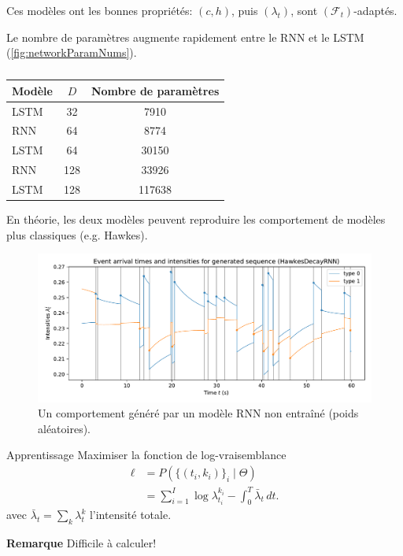 \documentclass{beamer}
\begin{document}
\begin{frame}
Ces modèles ont les bonnes propriétés: $(c,h)$, puis $(\lambda_t)$, sont $(\mathcal{F}_t)$-adaptés.

Le nombre de paramètres augmente rapidement entre le RNN et le LSTM (\autoref{fig:networkParamNums}).

\begin{table}
	\begin{tabular}{l|cc}\toprule
	Modèle & $D$ & Nombre de paramètres \\ \midrule
	LSTM & 32 & 7910 \\
	RNN & 64 & 8774 \\
	LSTM & 64 & 30150 \\
	RNN & 128 & 33926 \\
	LSTM & 128 & 117638 \\ \bottomrule
	\end{tabular}\caption{}\label{fig:networkParamNums}
\end{table}

\end{frame}

\begin{frame}
En théorie, les deux modèles peuvent reproduire les comportement de modèles plus classiques (e.g. Hawkes).

\begin{figure}
	\includegraphics[width=\linewidth]{../notebooks/example_rnnplot2d_hidden128.pdf}
	\caption{Un comportement généré par un modèle RNN non entraîné (poids aléatoires).}\label{fig:untrained1DRNNIntensity}
\end{figure}
	
\end{frame}

\begin{frame}{Apprentissage}
Maximiser la fonction de log-vraisemblance
\begin{equation}\label{eq:logLikelihood}
\begin{aligned}
\ell &= P\left( \{(t_i,k_i)\}_i \mid \Theta \right) \\
&= \sum_{i=1}^{I}\log \lambda^{k_i}_{t_i} - \int_0^T \bar{\lambda}_t\,dt.
\end{aligned}
\end{equation}
avec $\bar{\lambda}_t = \sum_k \lambda^k_t$ l'intensité totale.

\textbf{Remarque} Difficile à calculer!
\end{frame}
\end{document}
